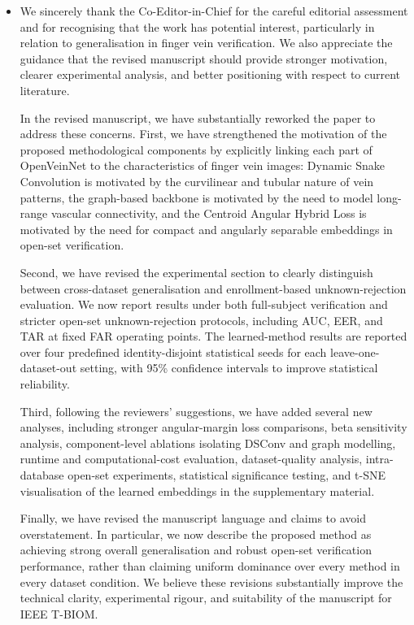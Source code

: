 \documentclass[11pt]{article}
\theoremstyle{remark}
\begin{document}
\begin{itemize}
	\item 

We sincerely thank the Co-Editor-in-Chief for the careful editorial assessment and for recognising that the work has potential interest, particularly in relation to generalisation in finger vein verification. We also appreciate the guidance that the revised manuscript should provide stronger motivation, clearer experimental analysis, and better positioning with respect to current literature.

In the revised manuscript, we have substantially reworked the paper to address these concerns. First, we have strengthened the motivation of the proposed methodological components by explicitly linking each part of OpenVeinNet to the characteristics of finger vein images: Dynamic Snake Convolution is motivated by the curvilinear and tubular nature of vein patterns, the graph-based backbone is motivated by the need to model long-range vascular connectivity, and the Centroid Angular Hybrid Loss is motivated by the need for compact and angularly separable embeddings in open-set verification.

Second, we have revised the experimental section to clearly distinguish between cross-dataset generalisation and enrollment-based unknown-rejection evaluation. We now report results under both full-subject verification and stricter open-set unknown-rejection protocols, including AUC, EER, and TAR at fixed FAR operating points. The learned-method results are reported over four predefined identity-disjoint statistical seeds for each leave-one-dataset-out setting, with 95\% confidence intervals to improve statistical reliability.

Third, following the reviewers' suggestions, we have added several new analyses, including stronger angular-margin loss comparisons, beta sensitivity analysis, component-level ablations isolating DSConv and graph modelling, runtime and computational-cost evaluation, dataset-quality analysis, intra-database open-set experiments, statistical significance testing, and t-SNE visualisation of the learned embeddings in the supplementary material.

Finally, we have revised the manuscript language and claims to avoid overstatement. In particular, we now describe the proposed method as achieving strong overall generalisation and robust open-set verification performance, rather than claiming uniform dominance over every method in every dataset condition. We believe these revisions substantially improve the technical clarity, experimental rigour, and suitability of the manuscript for IEEE T-BIOM.

\end{itemize}
\end{document}
